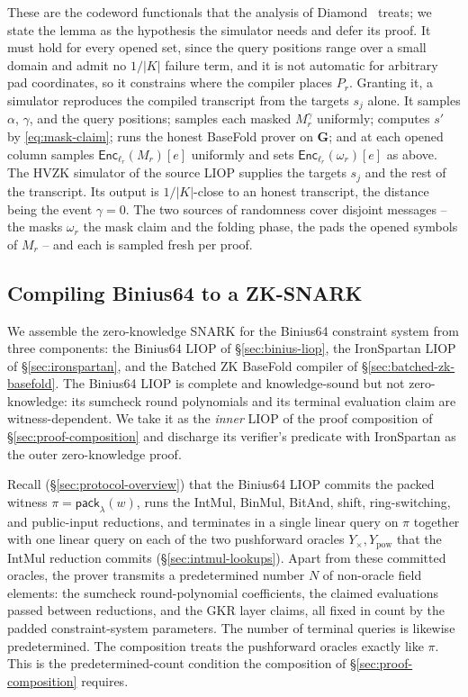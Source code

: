 \documentclass{article}
\theoremstyle{definition}
\begin{document}
These are the codeword functionals that the analysis of Diamond~\cite{Diamond:2025ac} treats; we state the lemma as the hypothesis the simulator needs and defer its proof. It must hold for every opened set, since the query positions range over a small domain and admit no $1/|K|$ failure term, and it is not automatic for arbitrary pad coordinates, so it constrains where the compiler places $P_r$. Granting it, a simulator reproduces the compiled transcript from the targets $s_j$ alone. It samples $\alpha$, $\gamma$, and the query positions; samples each masked $M^\gamma_r$ uniformly; computes $s'$ by \eqref{eq:mask-claim}; runs the honest BaseFold prover on $\boldsymbol{G}$; and at each opened column samples $\textsf{Enc}_{\ell_r}(M_r)[e]$ uniformly and sets $\textsf{Enc}_{\ell_r}(\omega_r)[e]$ as above. The HVZK simulator of the source LIOP supplies the targets $s_j$ and the rest of the transcript. Its output is $1/|K|$-close to an honest transcript, the distance being the event $\gamma = 0$. The two sources of randomness cover disjoint messages -- the masks $\omega_r$ the mask claim and the folding phase, the pads the opened symbols of $M_r$ -- and each is sampled fresh per proof.

\subsection{Compiling Binius64 to a ZK-SNARK}
\label{sec:binius-zk-snark}

We assemble the zero-knowledge SNARK for the Binius64 constraint system from three components: the Binius64 LIOP of \S\ref{sec:binius-liop}, the IronSpartan LIOP of \S\ref{sec:ironspartan}, and the Batched ZK BaseFold compiler of \S\ref{sec:batched-zk-basefold}. The Binius64 LIOP is complete and knowledge-sound but not zero-knowledge: its sumcheck round polynomials and its terminal evaluation claim are witness-dependent. We take it as the \emph{inner} LIOP of the proof composition of \S\ref{sec:proof-composition} and discharge its verifier's predicate with IronSpartan as the outer zero-knowledge proof.

Recall (\S\ref{sec:protocol-overview}) that the Binius64 LIOP commits the packed witness $\pi = \textsf{pack}_\lambda(w)$, runs the IntMul, BinMul, BitAnd, shift, ring-switching, and public-input reductions, and terminates in a single linear query on $\pi$ together with one linear query on each of the two pushforward oracles $Y_\times, Y_\text{pow}$ that the IntMul reduction commits (\S\ref{sec:intmul-lookups}). Apart from these committed oracles, the prover transmits a predetermined number $N$ of non-oracle field elements: the sumcheck round-polynomial coefficients, the claimed evaluations passed between reductions, and the GKR layer claims, all fixed in count by the padded constraint-system parameters. The number of terminal queries is likewise predetermined. The composition treats the pushforward oracles exactly like $\pi$. This is the predetermined-count condition the composition of \S\ref{sec:proof-composition} requires.
\end{document}
